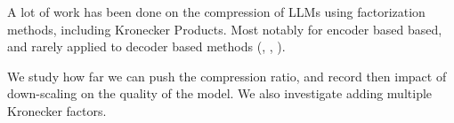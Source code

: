 \documentclass{article}
\begin{document}

A lot of work has been done on the compression of LLMs using factorization methods, including Kronecker Products. Most notably for encoder based based, and rarely applied to decoder based methods (\cite{tahaei2022kroneckerbert}, \cite{edalati2021kroneckr}, \cite{abronin2024tqcompressor}).


We study how far we can push the compression ratio, and record then impact of down-scaling on the quality of the model. We also investigate adding multiple Kronecker factors.

\begin{comment}
To the best of our knowledge, not many have focused on Freezing the initial pre-trained weights, i.e., most methods drop newly factorized matrices into the already pre-trained parameters, without carefully blending, nor assessing/studying how much the model is relying on already trained weights.

In this work:

\begin{itemize}
	\item   We investigate the impact of freezing on the quality of learning,  and also demonstrate the capacity for the network to just not rely on the new weights, and just use the already pre-trained one. 
	\item We also introduce a new distillation / training mechanism to ease the entry of these factorized weights into the old architecture. 
	\item We also show that freezing the other weights, helps the new introduced get more activation.
\end{itemize}

In this work, we demonstrate that without freezing, the network relies more on the pre-trained weights (to a varying degree, depending on how the new proposed weights are initialized). And with freezing, newly introduced weights learn faster.

Usually the newly introduced weights are brute forced into training, and in many cases not, (knowing how many LLMs are under-trained + many residual connections), the pre-trained carry the weights. We also compare the gradient activations in both cases (when we free and when don't).

In this work we demonstrate the effectiveness of freezing, and of slow integration of weights, either through training or distillation.


Using Van Loan has no remarkable benefit improvement over $50\%$ pruning.


\end{comment}
\end{document}
